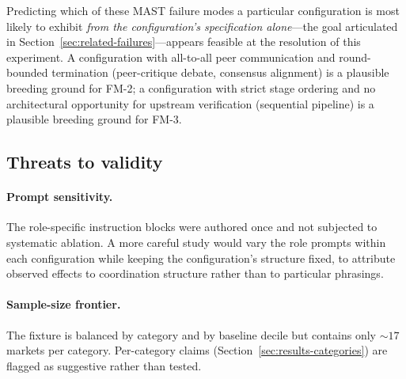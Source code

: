 \documentclass[11pt]{article}
\begin{document}
Predicting which of these MAST failure modes a particular configuration is most likely to exhibit \emph{from the configuration's specification alone}---the goal articulated in Section~\ref{sec:related-failures}---appears feasible at the resolution of this experiment. A configuration with all-to-all peer communication and round-bounded termination (peer-critique debate, consensus alignment) is a plausible breeding ground for FM-2; a configuration with strict stage ordering and no architectural opportunity for upstream verification (sequential pipeline) is a plausible breeding ground for FM-3.

\subsection{Threats to validity}
\label{sec:discussion-threats}

\paragraph{Prompt sensitivity.} The role-specific instruction blocks were authored once and not subjected to systematic ablation. A more careful study would vary the role prompts within each configuration while keeping the configuration's structure fixed, to attribute observed effects to coordination structure rather than to particular phrasings.

\paragraph{Sample-size frontier.} The fixture is balanced by category and by baseline decile but contains only $\sim 17$ markets per category. Per-category claims (Section~\ref{sec:results-categories}) are flagged as suggestive rather than tested.
\end{document}
